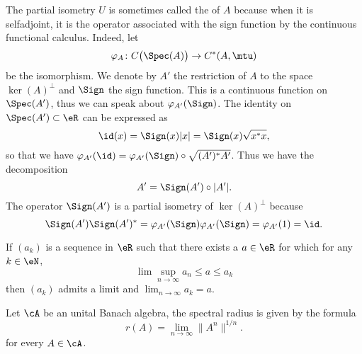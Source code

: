 The partial isometry $U$ is sometimes called the  of $A$ because when it is selfadjoint, it is the operator associated with the sign function by the continuous functional calculus. Indeed, let
\begin{equation}
	\varphi_A\colon C\big( \Spec(A) \big)\to C^*(A,\mtu)
\end{equation}
be the isomorphism. We denote by $A'$ the restriction of $A$ to the space $\ker(A)^{\perp}$ and $\Sign$ the sign function. This is a continuous function on $\Spec(A')$, thus we can speak about $\varphi_{A'}(\Sign)$. The identity on $\Spec(A')\subset\eR$ can be expressed as
\begin{equation}
	\id(x)=\Sign(x)| x |=\Sign(x)\sqrt{x^*x},
\end{equation}
so that we have $\varphi_{A'}(\id)=\varphi_{A'}(\Sign)\circ \sqrt{(A')^*A'}$. Thus we have the decomposition
\begin{equation}		\label{EqPolarSSKerSign}
	A'=\Sign(A')\circ| A' |.
\end{equation}
The operator $\Sign(A')$ is a partial isometry of $\ker(A)^{\perp}$ because
\begin{equation}
	\Sign(A')\Sign(A')^*=\varphi_{A'}(\Sign)\varphi_{A'}(\Sign)=\varphi_{A'}(1)=\id.
\end{equation}

\begin{proposition}			\label{prop:cv_lim_sup}
If $(a_k)$ is a sequence in $\eR$ such that there exists a $a\in\eR$ for which for any $k\in\eN$,
\[
\lim\sup_{n\to\infty}a_n\leq a\leq a_k
\]
then $(a_k)$ admits a limit and $\lim_{n\to\infty}a_k=a$.
\end{proposition}

\begin{proposition}
Let $\cA$ be an unital Banach algebra, the spectral radius is given by the formula
\begin{equation}
   r(A)=\lim_{n\to\infty}\| A^n \|^{1/n}.
\end{equation} \label{prop:An_usn}
for every $A\in\cA$.
\end{proposition}

